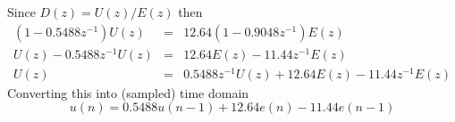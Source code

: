 Since $D(z)=U(z)/E(z)$ then
\begin{eqnarray*}
	(1-0.5488z^{-1})U(z) & = & 12.64(1-0.9048z^{-1})E(z) \\
	U(z) - 0.5488z^{-1}U(z) & = & 12.64 E(z) - 11.44 z^{-1} E(z) \\
	U(z) & = & 0.5488z^{-1}U(z) + 12.64 E(z) - 11.44 z^{-1} E(z)
\end{eqnarray*}
Converting this into (sampled) time domain
$$u(n) = 0.5488 u(n-1) + 12.64 e(n) - 11.44 e(n-1)$$
\endinput
